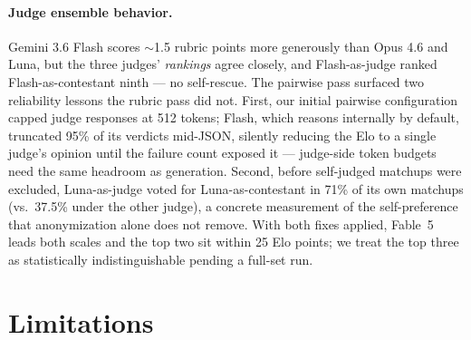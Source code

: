 \documentclass[11pt]{article}
\begin{document}
\paragraph{Judge ensemble behavior.} Gemini 3.6 Flash scores
$\sim$1.5 rubric points more generously than Opus 4.6 and Luna, but the
three judges' \emph{rankings} agree closely, and Flash-as-judge ranked
Flash-as-contestant ninth --- no self-rescue. The pairwise pass surfaced
two reliability lessons the rubric pass did not. First, our initial
pairwise configuration capped judge responses at 512 tokens; Flash,
which reasons internally by default, truncated 95\% of its verdicts
mid-JSON, silently reducing the Elo to a single judge's opinion until
the failure count exposed it --- judge-side token budgets need the same
headroom as generation. Second, before self-judged matchups were
excluded, Luna-as-judge voted for Luna-as-contestant in 71\% of its own
matchups (vs.\ 37.5\% under the other judge), a concrete measurement
of the self-preference that anonymization alone does not remove. With
both fixes applied, Fable~5 leads both scales and the top two sit within
25 Elo points; we treat the top three as statistically indistinguishable
pending a full-set run.

\section{Limitations}
\label{sec:limitations}
\end{document}
